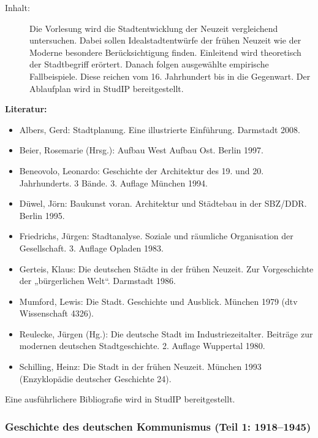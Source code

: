 \documentclass[%
a4paper, %
11pt,               %
leqno,              %
fleqn,              %
]
{scrartcl}
\begin{document}
\begin{description}
  \item[Inhalt:] Die Vorlesung wird die Stadtentwicklung der Neuzeit
    vergleichend untersuchen. Dabei sollen Idealstadtentwürfe der frühen Neuzeit
    wie der Moderne besondere Berücksichtigung finden. Einleitend wird
    theoretisch der Stadtbegriff erörtert. Danach folgen ausgewählte empirische
    Fallbeispiele. Diese reichen vom 16. Jahrhundert bis in die Gegenwart. Der
    Ablaufplan wird in StudIP bereitgestellt.
\end{description}
\textsf{\textbf{Literatur:}}
\begin{itemize}\itemsep0pt
  \item Albers, Gerd: Stadtplanung. Eine illustrierte Einführung. Darmstadt
    2008.
  \item Beier, Rosemarie (Hrsg.): Aufbau West Aufbau Ost. Berlin 1997.
  \item Beneovolo, Leonardo: Geschichte der Architektur des 19. und 20.
    Jahrhunderts. 3 Bände.  3. Auflage München 1994.
  \item Düwel, Jörn: Baukunst voran. Architektur und Städtebau in der SBZ/DDR.
    Berlin 1995.
  \item Friedrichs, Jürgen: Stadtanalyse.  Soziale und räumliche Organisation
    der Gesellschaft. 3. Auflage Opladen 1983.
  \item Gerteis, Klaus: Die deutschen Städte in der frühen Neuzeit. Zur
    Vorgeschichte der „bürgerlichen Welt“. Darmstadt 1986.
  \item Mumford, Lewis: Die Stadt. Geschichte und Ausblick. München 1979 (dtv
    Wissenschaft 4326).
  \item Reulecke, Jürgen (Hg.): Die deutsche Stadt im Industriezeitalter.
    Beiträge zur modernen deutschen Stadtgeschichte. 2. Auflage Wuppertal 1980.
  \item Schilling, Heinz: Die Stadt in der frühen Neuzeit. München 1993
    (Enzyklopädie deutscher Geschichte 24).
\end{itemize}
Eine ausführlichere Bibliografie wird in StudIP bereitgestellt.


\subsubsection{Geschichte des deutschen Kommunismus (Teil 1: 1918--1945)}
\label{ssub:Geschichte des deutschen Kommunismus (Teil 1: 1918--1945)}
\end{document}
